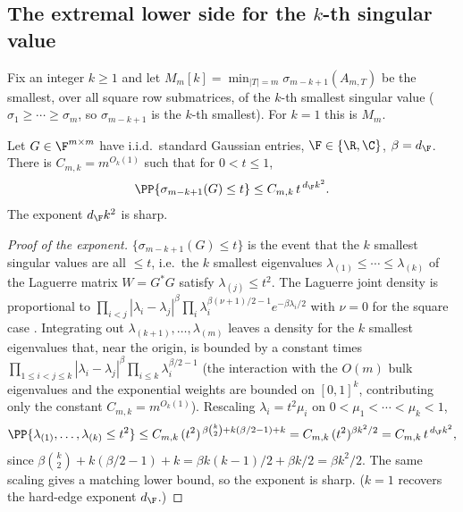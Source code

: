 
\subsection*{The extremal lower side for the $k$-th singular value}

Fix an integer $k\ge1$ and let $M_m[k]=\min_{|T|=m}\sigma_{m-k+1}(A_{m,T})$ be the
smallest, over all square row submatrices, of the $k$-th smallest singular value
($\sigma_1\ge\cdots\ge\sigma_m$, so $\sigma_{m-k+1}$ is the $k$-th smallest).  For
$k=1$ this is $M_m$.

\begin{lemma}\label{kth:one-matrix}
Let $G\in\F^{m\times m}$ have i.i.d.\ standard Gaussian entries, $\F\in\{\R,\C\}$,
$\beta=d_\F$.  There is $C_{m,k}=m^{O_k(1)}$ such that for $0<t\le1$,
\[
  \PP\{\sigma_{m-k+1}(G)\le t\}\le C_{m,k}\,t^{\,d_\F k^2}.
\]
The exponent $d_\F k^2$ is sharp.
\end{lemma}

\begin{proof}[Proof of the exponent]
$\{\sigma_{m-k+1}(G)\le t\}$ is the event that the $k$ smallest singular values are
all $\le t$, i.e.\ the $k$ smallest eigenvalues $\lambda_{(1)}\le\cdots\le\lambda_{(k)}$
of the Laguerre matrix $W=G^*G$ satisfy $\lambda_{(j)}\le t^2$.  The Laguerre joint
density is proportional to $\prod_{i<j}|\lambda_i-\lambda_j|^{\beta}\prod_i
\lambda_i^{\beta(\nu+1)/2-1}e^{-\beta\lambda_i/2}$ with $\nu=0$ for the square case
\cite{Forrester2010}.  Integrating out $\lambda_{(k+1)},\dots,\lambda_{(m)}$ leaves a
density for the $k$ smallest eigenvalues that, near the origin, is bounded by a
constant times $\prod_{1\le i<j\le k}|\lambda_i-\lambda_j|^{\beta}\prod_{i\le k}
\lambda_i^{\beta/2-1}$ (the interaction with the $O(m)$ bulk eigenvalues and the
exponential weights are bounded on $[0,1]^k$, contributing only the constant
$C_{m,k}=m^{O_k(1)}$).  Rescaling $\lambda_i=t^2\mu_i$ on $0<\mu_1<\cdots<\mu_k<1$,
\[
  \PP\{\lambda_{(1)},\dots,\lambda_{(k)}\le t^2\}
  \le C_{m,k}\,(t^2)^{\,\beta\binom{k}{2}+k(\beta/2-1)+k}
  = C_{m,k}\,(t^2)^{\beta k^2/2}=C_{m,k}\,t^{\,d_\F k^2},
\]
since $\beta\binom k2+k(\beta/2-1)+k=\beta k(k-1)/2+\beta k/2=\beta k^2/2$.  The same
scaling gives a matching lower bound, so the exponent is sharp.  ($k=1$ recovers the
hard-edge exponent $d_\F$.)
\end{proof}

